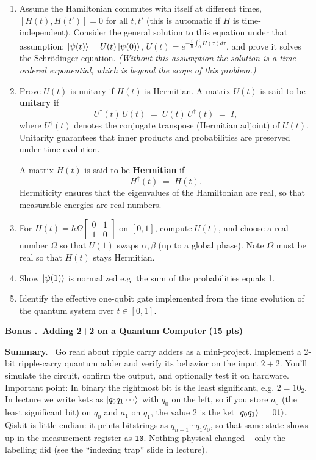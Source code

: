 \documentclass[11pt]{article}
\newcommand{\pts}[1]{\hfill{\small\bfseries(#1 pts)}}
\newenvironment{summary}{\vspace{2pt}\noindent\textbf{Summary.}~}{\par\vspace{6pt}}
\newcounter{problem}
\newcounter{bonus}
\newcommand{\bonus}[2]{%
  \refstepcounter{bonus}
  \vspace{10pt}\noindent\textbf{Bonus \Alph{bonus}.~#1} \pts{#2}\par
}
\begin{document}
\begin{enumerate}[label=(\alph*)]
  \item Assume the Hamiltonian commutes with itself at different times, $[H(t),H(t')]=0$ for all $t,t'$ (this is automatic if $H$ is time-independent). Consider the general solution to this equation under that assumption: $\ket{\psi(t)}=U(t)\ket{\psi(0)}$, $U(t)=e^{-\tfrac{i}{\hbar}\int_0^t H(\tau)d\tau}$, and prove it solves the Schr\"odinger equation. \textit{(Without this assumption the solution is a time-ordered exponential, which is beyond the scope of this problem.)}
  \item Prove $U(t)$ is unitary if $H(t)$ is Hermitian. A matrix $U(t)$ is said to be \textbf{unitary} if 
\[
U^\dagger(t)\,U(t) \;=\; U(t)\,U^\dagger(t) \;=\; I,
\]
where $U^\dagger(t)$ denotes the conjugate transpose (Hermitian adjoint) of $U(t)$.  
Unitarity guarantees that inner products and probabilities are preserved under time evolution.

A matrix $H(t)$ is said to be \textbf{Hermitian} if 
\[
H^\dagger(t) \;=\; H(t).
\]
Hermiticity ensures that the eigenvalues of the Hamiltonian are real, so that measurable energies are real numbers.
  \item For $H(t)=\hbar\Omega \begin{bmatrix}
0 & 1 \\
1 & 0
\end{bmatrix}$ on $[0,1]$, compute $U(t)$, and choose a real number $\Omega$ so that $U(1)$ swaps $\alpha,\beta$ (up to a global phase). Note $\Omega$ must be real so that $H(t)$ stays Hermitian.
  \item Show $\ket{\psi(1)}$ is normalized e.g. the sum of the probabilities equals 1.
  \item Identify the effective one-qubit gate implemented from the time evolution of the quantum system over $t\in[0,1]$. 
\end{enumerate}

\bonus{Adding 2+2 on a Quantum Computer}{15}
\begin{summary}
Go read about ripple carry adders as a mini-project. Implement a 2-bit ripple-carry quantum adder and verify its behavior on the input $2+2$. You’ll simulate the circuit, confirm the output, and optionally test it on hardware. Important point: In binary the rightmost bit is the least significant, e.g. $2 = 10_2$. In lecture we write kets as $\ket{q_0 q_1 \cdots}$ with $q_0$ on the left, so if you store $a_0$ (the least significant bit) on $q_0$ and $a_1$ on $q_1$, the value $2$ is the ket $\ket{q_0 q_1}=\ket{01}$. Qiskit is little-endian: it prints bitstrings as $q_{n-1}\cdots q_1 q_0$, so that same state shows up in the measurement register as \texttt{10}. Nothing physical changed -- only the labelling did (see the ``indexing trap'' slide in lecture).
\end{summary}
\end{document}

